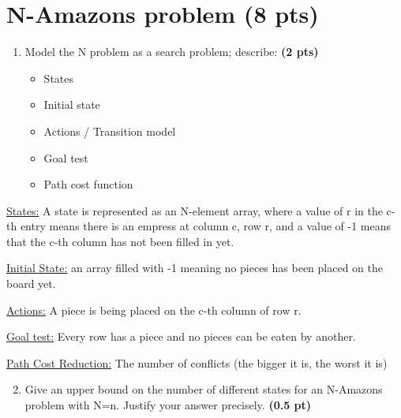 \documentclass[11pt,a4paper]{report}
\begin{document}
\section{N-Amazons problem (8 pts)}

\begin{enumerate}
  \item Model the N problem as a search problem; describe: \textbf{(2 pts)}
		\begin{itemize}
			\item States
			\item Initial state
			\item Actions / Transition model
			\item Goal test
			\item Path cost function
		\end{itemize}
\end{enumerate}

\begin{answers}[8cm]
	\underline{States:} A state is represented as an N-element array, where a value of r in the c-th entry means there is an empress at column c, row r, and a value of -1 means that the c-th column has not been filled in yet.
	
	\hspace{0.5cm}
	
	\underline{Initial State:} an  array filled with -1 meaning no pieces has been placed on the board yet.
	
	\hspace{0.5cm}
	
	\underline{Actions:} A piece is being placed on the c-th column of row r.
	
	\hspace{0.5cm}
	
	\underline{Goal test:} Every row has a piece and no pieces can be eaten by another.
	
	\hspace{0.5cm}
	
	\underline{Path Cost Reduction:} The number of conflicts (the bigger it is, the worst it is)
\end{answers}


\newpage
\begin{enumerate}
\setcounter{enumi}{1}
\item Give an upper bound on the number of different states for an N-Amazons problem with N=n. Justify your answer precisely. \textbf{(0.5 pt)}
\end{enumerate}
\end{document}
